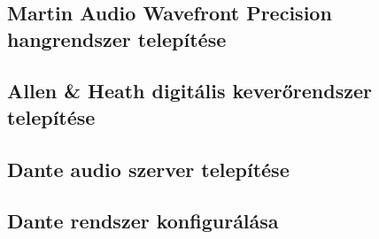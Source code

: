 \chapter{\SystemDeployment}



\section{Martin Audio Wavefront Precision hangrendszer telepítése}



\section{Allen \& Heath digitális keverőrendszer telepítése}




\section{Dante audio szerver telepítése}




\section{Dante rendszer konfigurálása}


